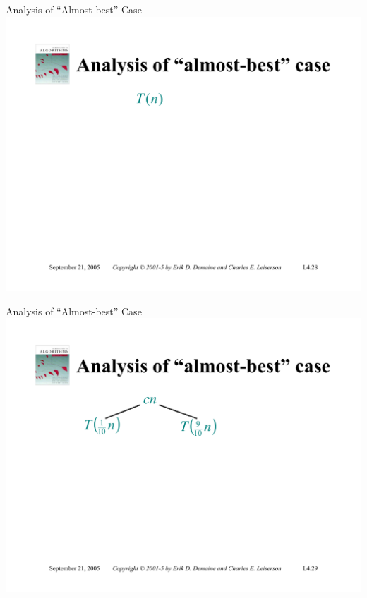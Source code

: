 \documentclass{beamer}
\begin{document}
\begin{frame}{Analysis of ``Almost-best'' Case}
    \centering
    \includegraphics[width=\textwidth, trim={1.00cm 1.50cm 1.00cm 4.25cm}, clip]{pages/lec4_28}
\end{frame}
\begin{frame}{Analysis of ``Almost-best'' Case}
    \centering
    \includegraphics[width=\textwidth, trim={1.00cm 1.50cm 1.00cm 4.25cm}, clip]{pages/lec4_29}
\end{frame}
\end{document}
